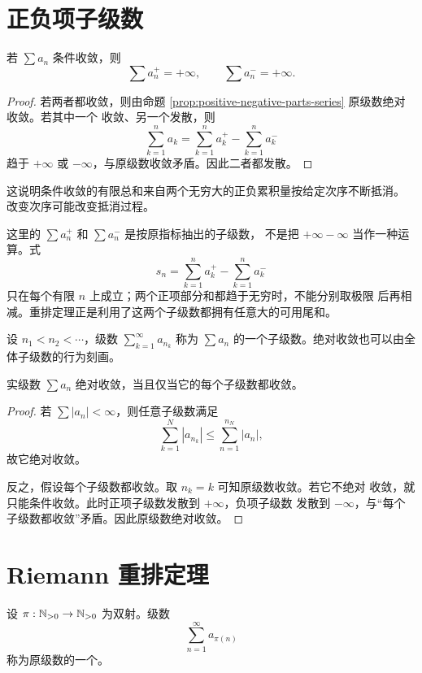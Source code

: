\section{正负项子级数}

\begin{theorem}
\label{thm:conditional-positive-negative-diverge}
若 \(\sum a_n\) 条件收敛，则
\[
 \sum a_n^+=+\infty,\qquad
 \sum a_n^-=+\infty.
\]
\end{theorem}

\begin{proof}
若两者都收敛，则由命题
\ref{prop:positive-negative-parts-series} 原级数绝对收敛。若其中一个
收敛、另一个发散，则
\[
 \sum_{k=1}^n a_k
 =\sum_{k=1}^n a_k^+-\sum_{k=1}^n a_k^-
\]
趋于 \(+\infty\) 或 \(-\infty\)，与原级数收敛矛盾。因此二者都发散。
\end{proof}

这说明条件收敛的有限总和来自两个无穷大的正负累积量按给定次序不断抵消。
改变次序可能改变抵消过程。

这里的 \(\sum a_n^+\) 和 \(\sum a_n^-\) 是按原指标抽出的子级数，
不是把 \(+\infty-\infty\) 当作一种运算。式
\[
 s_n=\sum_{k=1}^n a_k^+-\sum_{k=1}^n a_k^-
\]
只在每个有限 \(n\) 上成立；两个正项部分和都趋于无穷时，不能分别取极限
后再相减。重排定理正是利用了这两个子级数都拥有任意大的可用尾和。

设 \(n_1<n_2<\cdots\)，级数 \(\sum_{k=1}^\infty a_{n_k}\) 称为
\(\sum a_n\) 的一个子级数。绝对收敛也可以由全体子级数的行为刻画。

\begin{theorem}[绝对收敛的子级数刻画]
\label{thm:absolute-convergence-subseries}
实级数 \(\sum a_n\) 绝对收敛，当且仅当它的每个子级数都收敛。
\end{theorem}

\begin{proof}
若 \(\sum|a_n|<\infty\)，则任意子级数满足
\[
 \sum_{k=1}^N|a_{n_k}|\le\sum_{n=1}^{n_N}|a_n|,
\]
故它绝对收敛。

反之，假设每个子级数都收敛。取 \(n_k=k\) 可知原级数收敛。若它不绝对
收敛，就只能条件收敛。此时正项子级数发散到 \(+\infty\)，负项子级数
发散到 \(-\infty\)，与“每个子级数都收敛”矛盾。因此原级数绝对收敛。
\end{proof}

\section{Riemann 重排定理}

\begin{definition}
设 \(\pi:\mathbb{N}_{>0}\to\mathbb{N}_{>0}\) 为双射。级数
\[
 \sum_{n=1}^\infty a_{\pi(n)}
\]
称为原级数的一个。
\end{definition}

